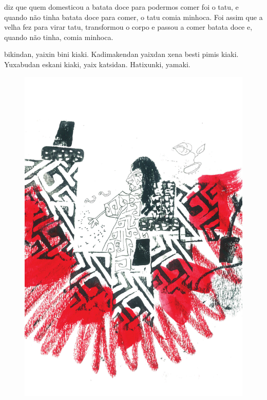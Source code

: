 
 diz que quem
domesticou a batata doce para
podermos comer foi o tatu, e
quando não tinha batata doce
para comer, o tatu comia minhoca.
Foi assim que a velha fez para
virar tatu, transformou o corpo
e passou a comer batata doce e,
quando não tinha, comia minhoca.

\vspace{2em}

 bikindan, yaixin bini kiaki.
Kadimakendan yaixdan
xena besti pimis kiaki.
Yuxabudan eskani kiaki, yaix
katsidan. Hatixunki, yamaki.

\vspace*{\fill}

\pagebreak
\thispagestyle{empty}
\begin{figure}[H]
\vspace*{-.5cm}
\hspace*{-2.2cm}\includegraphics[width=138mm]{./imgs/img13.pdf}
\end{figure}

\endgroup



